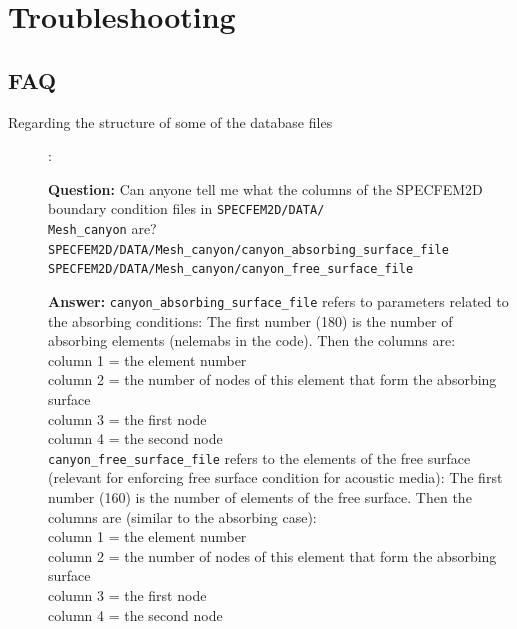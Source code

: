 \documentclass[oneside,english,onecolumn,letterpaper]{book}
\begin{document}
\chapter{\label{cha:Troubleshooting}Troubleshooting}



\section*{FAQ}

\begin{description}
\item[Regarding the structure of some of the database files] : \newline

{\bf Question:} Can anyone tell me what the columns of the SPECFEM2D boundary
condition files in \texttt{SPECFEM2D/DATA/}~\\
\texttt{Mesh\_canyon} are?\\

\texttt{SPECFEM2D/DATA/Mesh\_canyon/canyon\_absorbing\_surface\_file} \\
\texttt{SPECFEM2D/DATA/Mesh\_canyon/canyon\_free\_surface\_file}

{\bf Answer:} \texttt{canyon\_absorbing\_surface\_file} refers to parameters related to the
absorbing conditions:
The first number (180) is the number of absorbing elements (nelemabs in the
code).
Then the columns are:\\
column 1 = the element number\\
column 2 = the number of nodes of this element that form the absorbing surface\\
column 3 =  the first node\\
column 4 = the second node\\

\texttt{canyon\_free\_surface\_file} refers to the elements of the free surface
(relevant for enforcing free surface condition for acoustic media):
The first number (160) is the number of  elements of the free surface.
Then the columns are (similar to the absorbing case):\\
column 1 = the element number\\
column 2 = the number of nodes of this element that form the absorbing surface\\
column 3 =  the first node\\
column 4 = the second node\\


\end{description}
\end{document}
